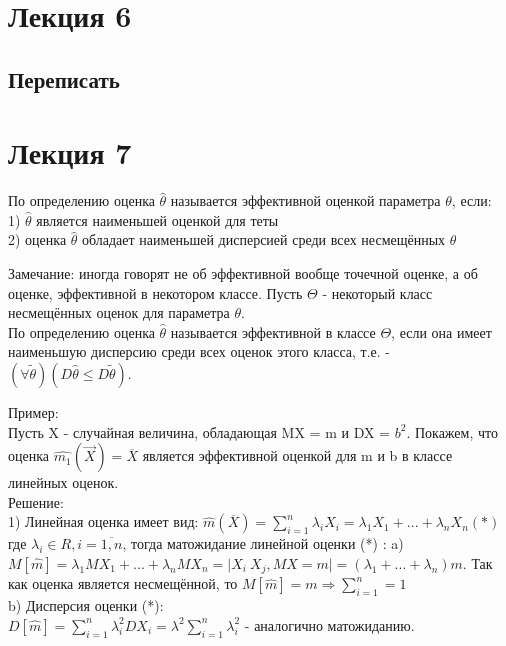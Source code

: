 \chapter{Лекция 6}
\section{Переписать}

\chapter{Лекция 7}
По определению оценка $\hat{\theta}$ называется эффективной оценкой параметра $\theta$, если:\\
1) $\hat{\theta}$ является наименьшей оценкой для теты\\
2) оценка $\hat{\theta}$ обладает наименьшей дисперсией среди всех несмещённых $\theta$

Замечание: иногда говорят не об эффективной вообще точечной оценке, а об оценке, эффективной в некотором классе. Пусть $\Theta$ - некоторый класс несмещённых оценок для параметра $\theta$.\\
По определению оценка $\hat{\theta}$ называется эффективной в классе $\Theta$, если она имеет наименьшую дисперсию среди всех оценок этого класса, т.е. - $(\forall \tilde{\theta})(D\hat{\theta} \leqslant D\tilde{\theta})$.

Пример:\\
Пусть X - случайная величина, обладающая MX = m и DX = $b^2$. Покажем, что оценка $\hat{m_{1}}(\overrightarrow{X}) = \overline{X}$ является эффективной оценкой для m и b в классе линейных оценок.\\

Решение:\\
1) Линейная оценка имеет вид: $\hat{m}(\overline{X}) = \sum\limits_{i = 1}^{n} \lambda_{i} X_{i} = \lambda_{1} X_{1} + ... + \lambda_{n} X_{n} (*)$\\
где $\lambda_{i} \in R, i  = \overline{1,n}$, тогда матожидание линейной оценки (*) :
a) $M[\hat{m}] = \lambda_{1} M X_{1} + ... + \lambda_{n} M X_{n} = \bigg| X_{i} ~ X_{j}, MX = m\bigg| = (\lambda_{1} + ... + \lambda_{n})m$. Так как оценка является несмещённой, то $M[\hat{m}] = m \Rightarrow \sum\limits_{i=1}^{n} = 1$\\
b) Дисперсия оценки (*):\\
$D[\hat{m}] = \sum\limits_{i=1}^{n} \lambda_{i}^{2} DX_{i} = \lambda^{2} \sum_{i=1}^{n} \lambda_{i}^{2}$ - аналогично матожиданию.\\

